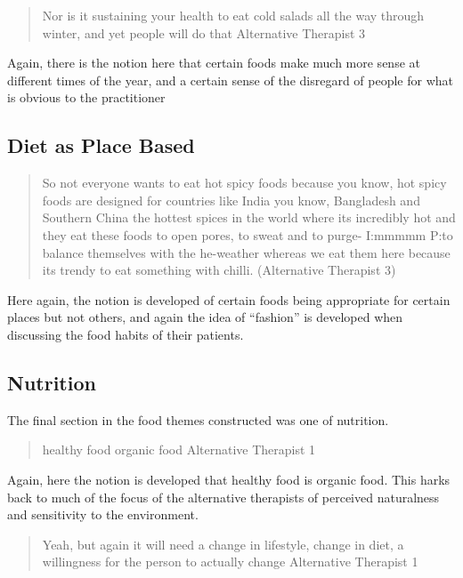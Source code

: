 \begin{quotation}
  Nor is it sustaining your health to eat cold salads all the way through winter, and yet people will do that
Alternative Therapist 3
\end{quotation}

Again, there is the notion here that certain foods make much more sense at different times of the year, and a certain sense of the disregard of people for what is obvious to the practitioner 



\subsection{Diet as Place Based}
\label{sec:diet-as-place}

\begin{quotation}
  So not everyone wants to eat hot spicy foods because you know, hot spicy foods are designed for countries like India you know, Bangladesh and Southern China the hottest spices in the world where its incredibly hot and they eat these foods to open pores, to sweat and to purge-
I:mmmmm
P:to balance themselves with the he-weather whereas we eat them here because its trendy to eat something with chilli.
(Alternative Therapist 3)
\end{quotation}

Here again, the notion is developed of certain foods being appropriate for certain places but not others, and again the idea of ``fashion'' is developed when discussing the food habits of their patients. 

\subsection{Nutrition}
\label{sec:nutrition}

The final section in the food themes constructed was one of nutrition. 

\begin{quotation}
  healthy food organic food
Alternative Therapist 1
\end{quotation}

Again, here the notion is developed that healthy food is organic food. This harks back to much of the focus of the alternative therapists of perceived naturalness and sensitivity to the environment. 

\begin{quotation}
  Yeah, but again it will need a change in lifestyle, change in diet, a willingness for the person to actually change 
Alternative Therapist 1
\end{quotation}

